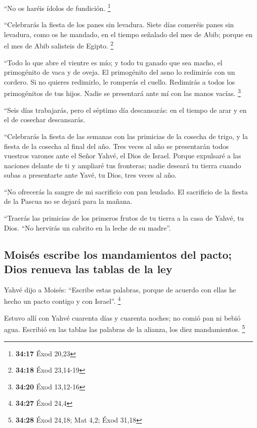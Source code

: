  ``No os haréis ídolos de fundición. \footnote{\textbf{34:17}
  Éxod 20,23}

 ``Celebrarás la fiesta de los panes sin levadura. Siete
días comeréis panes sin levadura, como os he mandado, en el tiempo
señalado del mes de Abib; porque en el mes de Abib salisteis de Egipto.
\footnote{\textbf{34:18} Éxod 23,14-19}

 ``Todo lo que abre el vientre es mío; y todo tu ganado
que sea macho, el primogénito de vaca y de oveja.  El
primogénito del asno lo redimirás con un cordero. Si no quieres
redimirlo, le romperás el cuello. Redimirás a todos los primogénitos de
tus hijos. Nadie se presentará ante mí con las manos vacías. \footnote{\textbf{34:20}
  Éxod 13,12-16}

 ``Seis días trabajarás, pero el séptimo día descansarás:
en el tiempo de arar y en el de cosechar descansarás.

 ``Celebrarás la fiesta de las semanas con las primicias
de la cosecha de trigo, y la fiesta de la cosecha al final del año.
 Tres veces al año se presentarán todos vuestros varones
ante el Señor Yahvé, el Dios de Israel.  Porque expulsaré
a las naciones delante de ti y ampliaré tus fronteras; nadie deseará tu
tierra cuando subas a presentarte ante Yavé, tu Dios, tres veces al año.

 ``No ofrecerás la sangre de mi sacrificio con pan
leudado. El sacrificio de la fiesta de la Pascua no se dejará para la
mañana.

 ``Traerás las primicias de los primeros frutos de tu
tierra a la casa de Yahvé, tu Dios. ``No hervirás un cabrito en la leche
de su madre''.

\hypertarget{moisuxe9s-escribe-los-mandamientos-del-pacto-dios-renueva-las-tablas-de-la-ley}{%
\subsection{Moisés escribe los mandamientos del pacto; Dios renueva las
tablas de la
ley}\label{moisuxe9s-escribe-los-mandamientos-del-pacto-dios-renueva-las-tablas-de-la-ley}}

 Yahvé dijo a Moisés: ``Escribe estas palabras, porque de
acuerdo con ellas he hecho un pacto contigo y con Israel''. \footnote{\textbf{34:27}
  Éxod 24,4}

 Estuvo allí con Yahvé cuarenta días y cuarenta noches;
no comió pan ni bebió agua. Escribió en las tablas las palabras de la
alianza, los diez mandamientos. \footnote{\textbf{34:28} Éxod 24,18; Mat
  4,2; Éxod 31,18}

